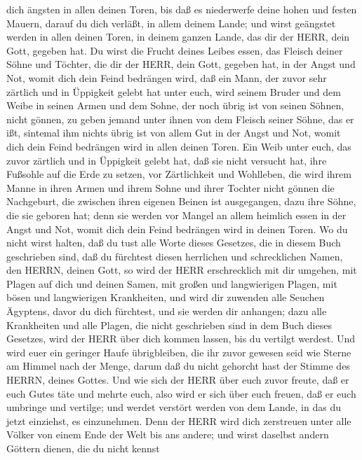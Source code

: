 dich ängsten in allen deinen Toren, bis daß es niederwerfe deine hohen
und festen Mauern, darauf du dich verläßt, in allem deinem Lande; und
wirst geängstet werden in allen deinen Toren, in deinem ganzen Lande,
das dir der HERR, dein Gott, gegeben hat.  Du wirst die
Frucht deines Leibes essen, das Fleisch deiner Söhne und Töchter, die
dir der HERR, dein Gott, gegeben hat, in der Angst und Not, womit dich
dein Feind bedrängen wird,  daß ein Mann, der zuvor sehr
zärtlich und in Üppigkeit gelebt hat unter euch, wird seinem Bruder und
dem Weibe in seinen Armen und dem Sohne, der noch übrig ist von seinen
Söhnen, nicht gönnen,  zu geben jemand unter ihnen von dem
Fleisch seiner Söhne, das er ißt, sintemal ihm nichts übrig ist von
allem Gut in der Angst und Not, womit dich dein Feind bedrängen wird in
allen deinen Toren.  Ein Weib unter euch, das zuvor
zärtlich und in Üppigkeit gelebt hat, daß sie nicht versucht hat, ihre
Fußsohle auf die Erde zu setzen, vor Zärtlichkeit und Wohlleben, die
wird ihrem Manne in ihren Armen und ihrem Sohne und ihrer Tochter nicht
gönnen  die Nachgeburt, die zwischen ihren eigenen Beinen
ist ausgegangen, dazu ihre Söhne, die sie geboren hat; denn sie werden
vor Mangel an allem heimlich essen in der Angst und Not, womit dich dein
Feind bedrängen wird in deinen Toren.  Wo du nicht wirst
halten, daß du tust alle Worte dieses Gesetzes, die in diesem Buch
geschrieben sind, daß du fürchtest diesen herrlichen und schrecklichen
Namen, den HERRN, deinen Gott,  so wird der HERR
erschrecklich mit dir umgehen, mit Plagen auf dich und deinen Samen, mit
großen und langwierigen Plagen, mit bösen und langwierigen Krankheiten,
 und wird dir zuwenden alle Seuchen Ägyptens, davor du dich
fürchtest, und sie werden dir anhangen;  dazu alle
Krankheiten und alle Plagen, die nicht geschrieben sind in dem Buch
dieses Gesetzes, wird der HERR über dich kommen lassen, bis du vertilgt
werdest.  Und wird euer ein geringer Haufe übrigbleiben,
die ihr zuvor gewesen seid wie Sterne am Himmel nach der Menge, darum
daß du nicht gehorcht hast der Stimme des HERRN, deines Gottes.
 Und wie sich der HERR über euch zuvor freute, daß er euch
Gutes täte und mehrte euch, also wird er sich über euch freuen, daß er
euch umbringe und vertilge; und werdet verstört werden von dem Lande, in
das du jetzt einziehst, es einzunehmen.  Denn der HERR wird
dich zerstreuen unter alle Völker von einem Ende der Welt bis ans
andere; und wirst daselbst andern Göttern dienen, die du nicht kennst
